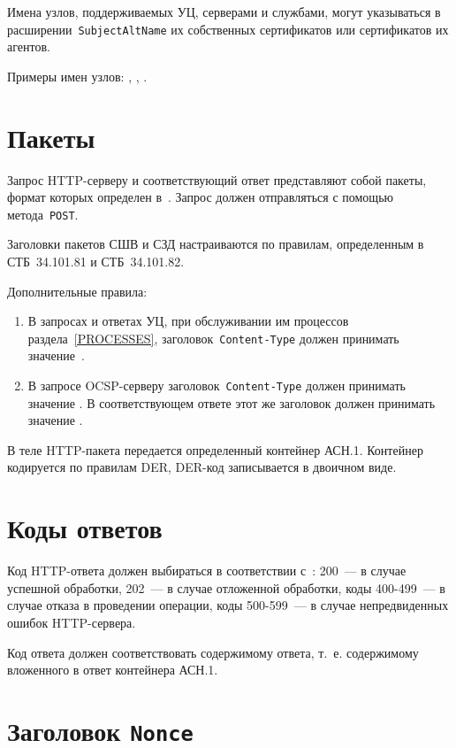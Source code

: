 Имена узлов, поддерживаемых УЦ, серверами и службами, могут указываться в 
расширении~\texttt{SubjectAltName} их собственных сертификатов или 
сертификатов их агентов. 

Примеры имен узлов: , 
, 
.

\section{Пакеты}\label{TRANSPORT.Packets}

Запрос HTTP-серверу и соответствующий ответ представляют собой пакеты,
формат которых определен в~\cite{HTTP}.
%
Запрос должен отправляться с помощью метода~\texttt{POST}.

Заголовки пакетов СШВ и СЗД настраиваются по правилам, 
определенным в СТБ~34.101.81 и СТБ~34.101.82. 

Дополнительные правила:
\begin{enumerate}
\item
В запросах и ответах УЦ, при обслуживании им процессов раздела~\ref{PROCESSES},
заголовок~\texttt{Content-Type} должен принимать значение~.

\item
В запросе OCSP-серверу заголовок~\texttt{Content-Type} 
должен принимать значение .
В соответствующем ответе этот же заголовок должен принимать значение 
. 
\end{enumerate}

В теле HTTP-пакета передается определенный контейнер АСН.1.
Контейнер кодируется по правилам DER, DER-код записывается
в двоичном виде.

\section{Коды ответов}\label{TRANSPORT.Codes}

Код HTTP-ответа должен выбираться в соответствии с~\cite{HTTP}: 
200~--- в случае успешной обработки, 
202~--- в случае отложенной обработки,
коды 400-499~--- в случае отказа в проведении операции,
коды 500-599~--- в случае непредвиденных ошибок HTTP-сервера.

Код ответа должен соответствовать содержимому ответа, т.~е.
содержимому вложенного в ответ контейнера АСН.1.

\section{Заголовок \texttt{Nonce}}\label{TRANSPORT.Nonce}

